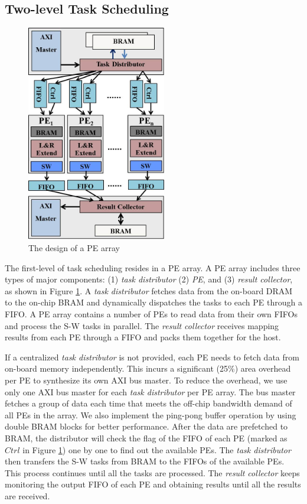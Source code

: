 \subsection{Two-level Task Scheduling}

\begin{figure}[!hbt]
\begin{center}
\includegraphics[width=2.4in]{Figures/Figure_Arch2.jpg}
\caption {The design of a PE array} \label{fig:schedule_structure} \end{center} \end{figure}

The first-level of task scheduling resides in a PE array. 
A PE array includes three types of major components: (1) \textit{task distributor} (2) \textit{PE}, and (3) \textit{result collector}, 
as shown in Figure \ref{fig:schedule_structure}.
A \textit{task distributor} fetches data from the on-board DRAM to the on-chip BRAM and dynamically dispatches the tasks to each PE through a FIFO.
A PE array contains a number of PEs to read data from their own FIFOs and process the S-W tasks in parallel.
The \textit{result collector} receives mapping results from each PE through a FIFO and packs them together for the host.

If a centralized \textit{task distributor} is not provided, each PE needs to fetch data from on-board memory independently. 
This incurs a significant (25\%) area overhead per PE to synthesize its own AXI bus master. 
To reduce the overhead, we use only one AXI bus master for each \textit{task distributor} per PE array. 
The bus master fetches a group of data each time that meets the off-chip bandwidth demand of all PEs in the array. 
We also implement the ping-pong buffer operation by using double BRAM blocks for better performance. 
After the data are prefetched to BRAM, 
the distributor will check the flag of the FIFO of each PE (marked as $Ctrl$ in Figure \ref{fig:schedule_structure}) one by one to find out the available PEs. 
The \textit{task distributor} then transfers the S-W tasks from BRAM to the FIFOs of the available PEs. 
This process continues until all the tasks are processed.
The \textit{result collector} keeps monitoring the output FIFO of each PE and obtaining results until all the results are received.

